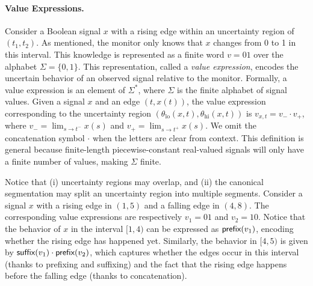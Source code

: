 \paragraph*{Value Expressions.}
Consider a Boolean signal \( x \) with a rising edge within an uncertainty region of \((t_1, t_2)\).
As mentioned, the monitor only knows that \( x \) changes from 0 to 1 in this interval.
This knowledge is represented as a finite word \( v = 01 \) over the alphabet \(\Sigma = \{0,1\}\).
This representation, called a \emph{value expression}, encodes the uncertain behavior of an observed signal relative to the monitor.
Formally, a value expression is an element of \(\Sigma^*\), where \(\Sigma\) is the finite alphabet of signal values.
Given a signal \( x \) and an edge \((t, x(t))\), the value expression corresponding to the uncertainty region \((\theta_{\text{lo}}(x,t), \theta_{\text{hi}}(x,t))\) is \( v_{x,t} = v_- \cdot v_+ \), where \( v_- = \lim_{s \to t^-} x(s) \) and \( v_+ = \lim_{s \to t^+} x(s) \).
We omit the concatenation symbol \(\cdot\) when the letters are clear from context.
This definition is general because finite-length piecewise-constant real-valued signals will only have a finite number of values, making \(\Sigma\) finite.

Notice that (i) uncertainty regions may overlap, and (ii) the canonical segmentation may split an uncertainty region into multiple segments.
Consider a signal $x$ with a rising edge in $(1,5)$ and a falling edge in $(4,8)$.
The corresponding value expressions are respectively $v_1 = 01$ and $v_2 = 10$.
Notice that the behavior of $x$ in the interval $[1,4)$ can be expressed as $\textsf{prefix}(v_1)$, encoding whether the rising edge has happened yet.
Similarly, the behavior in $[4,5)$ is given by $\textsf{suffix}(v_1) \cdot \textsf{prefix}(v_2)$, which captures whether the edges occur in this interval (thanks to prefixing and suffixing) and the fact that the rising edge happens before the falling edge (thanks to concatenation).

%	
%


